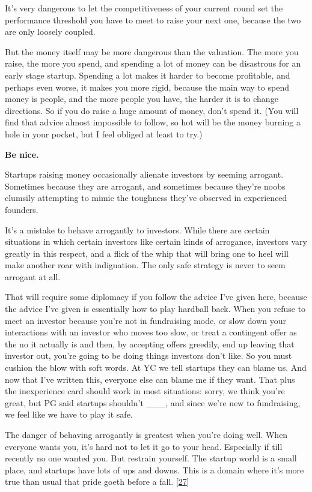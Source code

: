 It's very dangerous to let the competitiveness of your current round set
the performance threshold you have to meet to raise your next one,
because the two are only loosely coupled.

But the money itself may be more dangerous than the valuation. The more
you raise, the more you spend, and spending a lot of money can be
disastrous for an early stage startup. Spending a lot makes it harder to
become profitable, and perhaps even worse, it makes you more rigid,
because the main way to spend money is people, and the more people you
have, the harder it is to change directions. So if you do raise a huge
amount of money, don't spend it. (You will find that advice almost
impossible to follow, so hot will be the money burning a hole in your
pocket, but I feel obliged at least to try.)

\textbf{Be nice.}

Startups raising money occasionally alienate investors by seeming
arrogant. Sometimes because they are arrogant, and sometimes because
they're noobs clumsily attempting to mimic the toughness they've
observed in experienced founders.

It's a mistake to behave arrogantly to investors. While there are
certain situations in which certain investors like certain kinds of
arrogance, investors vary greatly in this respect, and a flick of the
whip that will bring one to heel will make another roar with
indignation. The only safe strategy is never to seem arrogant at all.

That will require some diplomacy if you follow the advice I've given
here, because the advice I've given is essentially how to play hardball
back. When you refuse to meet an investor because you're not in
fundraising mode, or slow down your interactions with an investor who
moves too slow, or treat a contingent offer as the no it actually is and
then, by accepting offers greedily, end up leaving that investor out,
you're going to be doing things investors don't like. So you must
cushion the blow with soft words. At YC we tell startups they can blame
us. And now that I've written this, everyone else can blame me if they
want. That plus the inexperience card should work in most situations:
sorry, we think you're great, but PG said startups shouldn't \_\_\_, and
since we're new to fundraising, we feel like we have to play it safe.

The danger of behaving arrogantly is greatest when you're doing well.
When everyone wants you, it's hard not to let it go to your head.
Especially if till recently no one wanted you. But restrain yourself.
The startup world is a small place, and startups have lots of ups and
downs. This is a domain where it's more true than usual that pride goeth
before a fall. {[}\hyperref[f27n]{27}{]}


